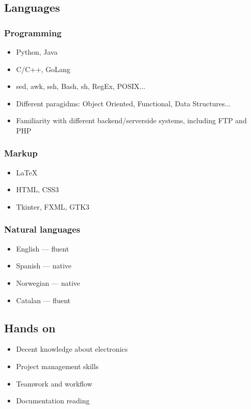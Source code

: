 \documentclass{curriculum}
\begin{document}
	\subsection{Languages}
	\begin{half}
		\subsubsection{Programming}
			\begin{itemize}
				\item Python, Java
				\item C/C++, GoLang
				\item sed, awk, ssh, Bash, sh, RegEx, POSIX...
				\item Different paragidms: Object Oriented, Functional, Data Structures...
				\item Familiarity with different backend/serverside systems, including FTP and PHP
			\end{itemize}
		\subsubsection{Markup}
			\begin{itemize}
				\item \LaTeX
				\item HTML, CSS3
				\item Tkinter, FXML, GTK3
			\end{itemize}
	\end{half}
	\begin{half}
		\subsubsection{Natural languages}
			\begin{itemize}
				\item English --- fluent
				\item Spanish --- native
				\item Norwegian --- native
				\item Catalan --- fluent
			\end{itemize}
	\subsection{Hands on}
	\begin{itemize} 
		\item Decent knowledge about electronics
		\item Project management skills
		\item Teamwork and workflow
		\item Documentation reading
	\end{itemize}	

	\end{half}
\end{document}
